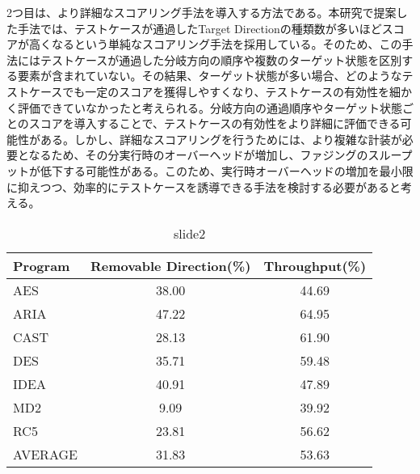 2つ目は、より詳細なスコアリング手法を導入する方法である。本研究で提案した手法では、テストケースが通過したTarget Directionの種類数が多いほどスコアが高くなるという単純なスコアリング手法を採用している。そのため、この手法にはテストケースが通過した分岐方向の順序や複数のターゲット状態を区別する要素が含まれていない。その結果、ターゲット状態が多い場合、どのようなテストケースでも一定のスコアを獲得しやすくなり、テストケースの有効性を細かく評価できていなかったと考えられる。分岐方向の通過順序やターゲット状態ごとのスコアを導入することで、テストケースの有効性をより詳細に評価できる可能性がある。しかし、詳細なスコアリングを行うためには、より複雑な計装が必要となるため、その分実行時のオーバーヘッドが増加し、ファジングのスループットが低下する可能性がある。このため、実行時オーバーヘッドの増加を最小限に抑えつつ、効率的にテストケースを誘導できる手法を検討する必要があると考える。\par


\begin{table}[ht]
  \centering
  \caption{slide2}
  \label{slide2}
  \begin{tabular}{lcc}
    \toprule
    \textbf{Program}  & \textbf{Removable Direction(\%)} & \textbf{Throughput(\%)}\\
    \midrule
    AES   & 38.00     & 44.69   \\
    ARIA  & 47.22     & 64.95   \\
    CAST  & 28.13     & 61.90   \\
    DES   & 35.71     & 59.48	  \\
    IDEA  & 40.91     & 47.89   \\
    MD2   & 9.09      & 39.92   \\
    RC5   & 23.81     & 56.62   \\
    \midrule
    AVERAGE & 31.83   & 53.63   \\
    \bottomrule
  \end{tabular}
\end{table}

